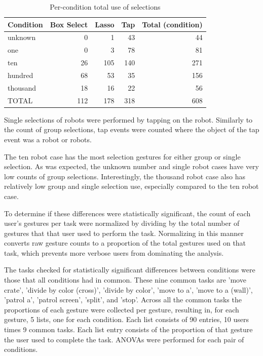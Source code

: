 \begin{table}
	\centering
	\begin{tabular}{l r r r r}
		Condition & Box Select & Lasso & Tap & Total (condition)\\
		\hline
		unknown & 0 & 1 & 43 & 44 \\
		one & 0 & 3 & 78 & 81\\
		ten & 26 & 105 & 140 & 271\\
		hundred & 68 & 53 & 35 & 156\\
		thousand & 18 & 16 & 22 & 56\\
		\hline
		TOTAL & 112 & 178 & 318 & 608\\
	\end{tabular}
	\caption{Per-condition total use of selections}
\end{table}

Single selections of robots were performed by tapping on the robot. 
Similarly to the count of group selections, tap events were counted where the object of the tap event was a robot or robots. 

The ten robot case has the most selection gestures for either group or single selection. 
As was expected, the unknown number and single robot cases have very low counts of group selections. 
Interestingly, the thousand robot case also has relatively low group and single 
selection use, especially compared to the ten robot case. 

To determine if these differences were statistically significant, the count of each user's gestures per task were normalized by dividing by the total number of gestures that that user used to perform the task. 
Normalizing in this manner converts raw gesture counts to a proportion of the total gestures used on that task, which prevents more verbose users from dominating the analysis.

The tasks checked for statistically significant differences between conditions were those that all conditions had in common. 
These nine common tasks are 'move crate', 'divide by color (cross)', 'divide by color', 'move to a', 'move to a (wall)', 'patrol a', 'patrol screen', 'split', and 'stop'. 
Across all the common tasks the proportions of each gesture were collected per gesture, resulting in, for each gesture, 5 lists, one for each condition. Each list consists of 90 entries, 10 users times 9 common tasks. Each list entry consists of the proportion of that gesture the user used to complete the task. ANOVAs were performed for each pair of conditions. 

